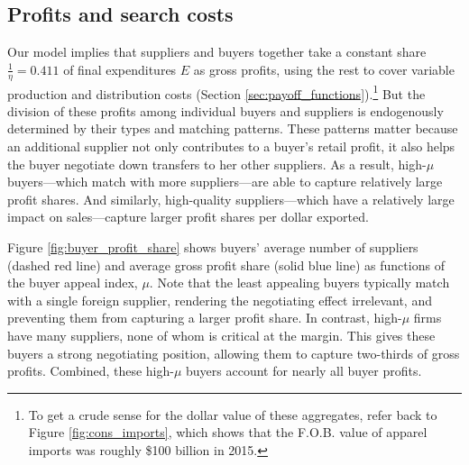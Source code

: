 \documentclass[12pt]{article} \usepackage{amsmath,amssymb,amsthm,geometry,graphicx,setspace,algorithm,algpseudocode,float}
\begin{document}
\subsection{Profits and search costs}
\label{sec:profit}
Our model implies that suppliers and buyers together take a constant share $\frac{1}{\eta} = 0.411$ of final expenditures $E$ as gross profits, using the rest to cover variable production and distribution costs (Section \ref{sec:payoff_functions}).\footnote{To get a crude sense for the dollar value of these aggregates, refer back to Figure \ref{fig:cons_imports}, which shows that the F.O.B. value of apparel imports was roughly \$100 billion in 2015.} But the division of these profits among individual buyers and suppliers is endogenously determined by their types and matching patterns. These patterns matter because an additional supplier not only contributes to a buyer's retail profit, it also helps the buyer negotiate down transfers to her other suppliers. As a result, high-$\mu$ buyers---which match with more suppliers---are able to capture relatively large profit shares. And similarly, high-quality suppliers---which have a relatively large impact on sales---capture larger profit shares per dollar exported. 
\par
 Figure \ref{fig:buyer_profit_share} shows buyers' average number of suppliers (dashed red line) and average gross profit share (solid blue line) as functions of the buyer appeal index, $\mu$. Note that the least appealing buyers typically match with a single foreign supplier, rendering the negotiating effect irrelevant, and preventing them from capturing a larger profit share. In contrast, high-$\mu$ firms have many suppliers, none of whom is critical at the margin. This gives these buyers a strong negotiating position, allowing them to capture two-thirds of gross profits. Combined, these high-$\mu$ buyers account for nearly all buyer profits.
\end{document}
